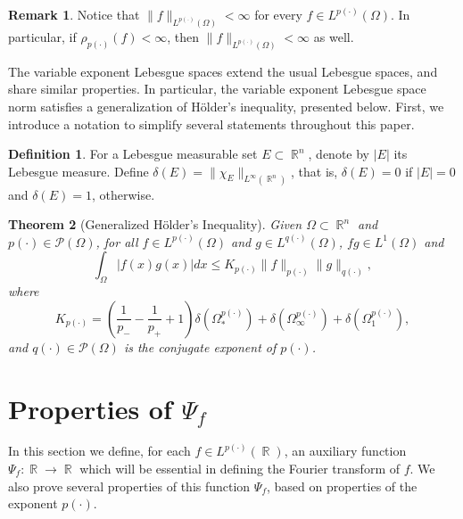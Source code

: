 \documentclass[11pt,reqno]{amsart}
\newtheorem{theorem}{Theorem}[section]
\theoremstyle{definition}
\theoremstyle{definition}
\newtheorem{obs}{Remark}
\theoremstyle{definition}
\newtheorem{definition}[theorem]{Definition}
\DeclareMathOperator{\R}{\mathbb{R}}
\newcommand{\p}{p(\cdot)}
\newcommand{\q}{q(\cdot)}
\newcommand{\Lp}{L^{\p}(\R)}
\begin{document}
\begin{obs}\label{remark_no_lambda}
    Notice that $\|f\|_{L^{\p}(\Omega)}<\infty$ for every $f\in L^{\p}(\Omega)$. In particular, if $\rho_{\p}(f)<\infty$, then $\|f\|_{L^{\p}(\Omega)}<\infty$ as well.
\end{obs}

The variable exponent Lebesgue spaces extend the usual Lebesgue spaces, and share similar properties. In particular, the variable exponent Lebesgue space norm satisfies a generalization of Hölder's inequality, presented below. First, we introduce a notation to simplify several statements throughout this paper.

\begin{definition}
    For a Lebesgue measurable set $E\subset \R^n$, denote by $|E|$ its Lebesgue measure. Define $\delta(E)=\|\chi_{E}\|_{L^\infty(\R^n)}$, that is, $\delta(E)=0$ if $|E|=0$ and $\delta(E)=1$, otherwise.
\end{definition}



\begin{theorem}[Generalized Hölder's Inequality]
    Given $\Omega\subset\R^n$ and $\p\in\mathcal{P}(\Omega)$, for all $f\in L^{\p}(\Omega)$ and $g\in L^{\q}(\Omega)$, $fg\in L^1(\Omega)$ and 
    \begin{equation*}
        \int_\Omega|f(x)g(x)|dx\leq K_{\p}\|f\|_{\p}\|g\|_{\q},
    \end{equation*}
    where 
    \begin{equation*}
        K_{\p}=\left(\frac{1}{p_{-}}-\frac{1}{p_{+}}+1\right)\delta\left(\Omega_*^{\p}\right)+\delta\left(\Omega_\infty^{\p}\right)+\delta\left(\Omega_1^{\p}\right),
    \end{equation*}
    and $\q\in\mathcal{P}(\Omega)$ is the conjugate exponent of $\p$. 
\end{theorem}

\section{Properties of \texorpdfstring{$\Psi_f$}{}}\label{sec-prop-psi}
In this section we define, for each $f\in\Lp$, an auxiliary function $\Psi_f:\R\to\R$ which will be essential in defining the Fourier transform of $f$. We also prove several properties of this function $\Psi_f$, based on properties of the exponent $\p$.
\end{document}
